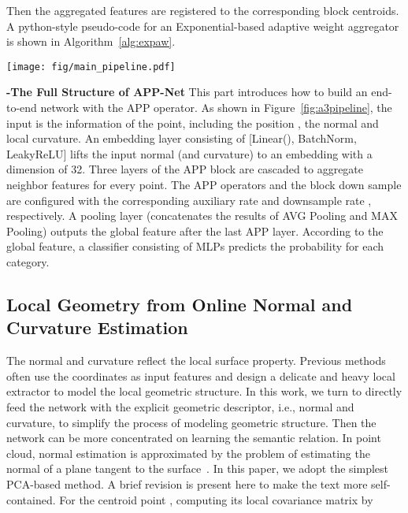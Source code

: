 \documentclass[journal]{IEEEtran}
\begin{document}
\noindent
Then the aggregated features are registered to the corresponding block centroids. A python-style pseudo-code for an Exponential-based adaptive weight aggregator is shown in Algorithm~\ref{alg:expaw}.





\begin{figure*}[tbp]
\begin{center}
\texttt{[image: fig/main\_pipeline.pdf]}
\end{center}
\caption{The whole structure of the proposed APP-Net. The channel of normal estimation is 3 or 4, which corresponds to whether to use the curvature.}
   \label{fig:a3pipeline}
\end{figure*}

\noindent
{\bf -The Full Structure of APP-Net}
This part introduces how to build an end-to-end network with the APP operator. As shown in Figure~\ref{fig:a3pipeline}, the input is the information of the point, including the position , the normal and local curvature. An embedding layer consisting of [Linear(), BatchNorm, LeakyReLU] lifts the input normal (and curvature) to an embedding with a dimension of 32. Three layers of the APP block are cascaded to aggregate neighbor features for every point. The APP operators and the block down sample are configured with the corresponding auxiliary rate  and downsample rate , respectively. A pooling layer (concatenates the results of AVG Pooling and MAX Pooling) outputs the global feature after the last APP layer. According to the global feature, a classifier consisting of MLPs predicts the probability for each category. 



\subsection{Local Geometry from Online Normal and Curvature Estimation}
The normal and curvature reflect the local surface property. Previous methods often use the coordinates as input features and design a delicate and heavy local extractor to model the local geometric structure. In this work, we turn to directly feed the network with the explicit geometric descriptor, i.e., normal and curvature, to simplify the process of modeling geometric structure. Then the network can be more concentrated on learning the semantic relation. In point cloud, normal estimation is approximated by the problem of estimating the normal of a plane tangent to the surface~\cite{pcl}. In this paper, we adopt the simplest PCA-based method. A brief revision is present here to make the text more self-contained. For the centroid point , computing its local covariance matrix by
\end{document}
